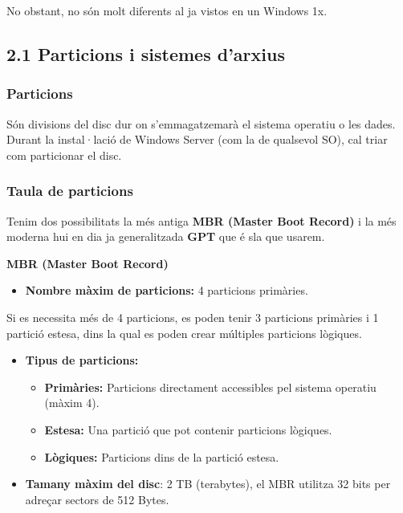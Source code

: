\documentclass[
  a4paper,
]{article}
\providecommand{\tightlist}{%
  \setlength{\itemsep}{0pt}\setlength{\parskip}{0pt}}
\begin{document}
No obstant, no són molt diferents al ja vistos en un Windows 1x.

\subsection{2.1 Particions i sistemes
d'arxius}\label{particions-i-sistemes-darxius}

\subsubsection{Particions}\label{particions}

Són divisions del disc dur on s'emmagatzemarà el sistema operatiu o les
dades. Durant la instal·lació de Windows Server (com la de qualsevol
SO), cal triar com particionar el disc.

\subsubsection{Taula de particions}\label{taula-de-particions}

Tenim dos possibilitats la més antiga \textbf{MBR (Master Boot Record)}
i la més moderna hui en dia ja generalitzada \textbf{GPT} que é sla que
usarem.

\textbf{MBR (Master Boot Record)}

\begin{itemize}
\tightlist
\item
  \textbf{Nombre màxim de particions:} 4 particions primàries.
\end{itemize}

Si es necessita més de 4 particions, es poden tenir 3 particions
primàries i 1 partició estesa, dins la qual es poden crear múltiples
particions lògiques.

\begin{itemize}
\item
  \textbf{Tipus de particions:}

  \begin{itemize}
  \item
    \textbf{Primàries:} Particions directament accessibles pel sistema
    operatiu (màxim 4).
  \item
    \textbf{Estesa:} Una partició que pot contenir particions lògiques.
  \item
    \textbf{Lògiques:} Particions dins de la partició estesa.
  \end{itemize}
\item
  \textbf{Tamany màxim del disc}: 2 TB (terabytes), el MBR utilitza 32
  bits per adreçar sectors de 512 Bytes.
\end{itemize}
\end{document}
